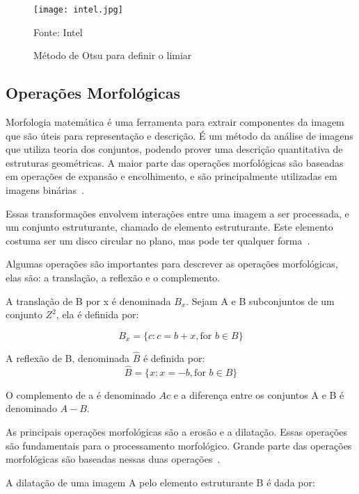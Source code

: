 \begin{figure}[H]
	\centering
	\texttt{[image: intel.jpg]}
	\caption{Método de Otsu para definir o limiar}
Fonte: Intel~\cite{intel2017dev}
	\label{fig:otsu_ex}
\end{figure}

\subsection{Operações Morfológicas}
\label{sec:morfologicas}

Morfologia matemática é uma ferramenta para extrair componentes da imagem que
são úteis para representação e descrição. É um método da análise de imagens que
utiliza teoria dos conjuntos, podendo prover uma descrição quantitativa de
estruturas geométricas. A maior parte das operações morfológicas são baseadas em
operações de expansão e encolhimento, e são principalmente utilizadas em imagens
binárias~\cite{owens1997morphology}.

Essas transformações envolvem interações entre uma imagem a ser processada, e um
conjunto estruturante, chamado de elemento estruturante. Este elemento costuma
ser um disco circular no plano, mas pode ter qualquer
forma~\cite{owens1997morphology}.

Algumas operações são importantes para descrever as operações morfológicas, elas
são: a translação, a reflexão e o complemento.

A translação de B por x é denominada \(B_x\). Sejam A e B subconjuntos de um
conjunto \(Z^2\), ela é definida por:

\begin{displaymath}
B_x = \{c : c = b + x, \mbox{for } b \in B\}
\end{displaymath}

A reflexão de B, denominada $\hat{B}$ é definida por:
\begin{displaymath}
\hat{B} = \{x : x = -b, \mbox{for } b \in B\}
\end{displaymath}

O complemento de a é denominado $Ac$ e a diferença entre os conjuntos A e B é
denominado $A-B$.

As principais operações morfológicas são a erosão e a dilatação. Essas operações
são fundamentais para o processamento morfológico. Grande parte das operações
morfológicas são baseadas nessas duas operações~\cite{gonzalez1977digital}.

A dilatação de uma imagem A pelo elemento estruturante B é dada por:

